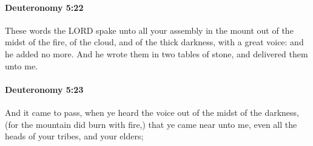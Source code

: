 		\paragraph{Deuteronomy 5:22} %
			\label{DEUTERONOMY-5-22}

			These words the LORD spake unto all your assembly in the mount out of the midst of the fire, of the cloud, and of the thick darkness, with a great voice: and he added no more. And he wrote them in two tables of stone, and delivered them unto me.


		\paragraph{Deuteronomy 5:23} %
			\label{DEUTERONOMY-5-23}

			And it came to pass, when ye heard the voice out of the midst of the darkness, (for the mountain did burn with fire,) that ye came near unto me, even all the heads of your tribes, and your elders;

